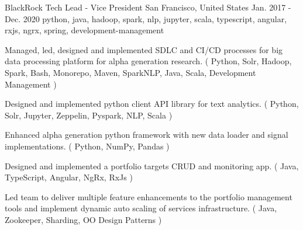 \cventry
    {BlackRock} %
    {Tech Lead - Vice President} %
    {San Francisco, United States} %
    {Jan. 2017 - Dec. 2020} %
    { python, java, hadoop, spark, nlp, jupyter, scala, typescript, angular, rxjs, ngrx, spring, development-management} %
    {
    \begin{cvitems} %
        \item { Managed, led, designed and implemented SDLC and CI/CD processes for big data processing platform for alpha generation research. ( Python, Solr, Hadoop, Spark, Bash, Monorepo, Maven, SparkNLP, Java, Scala, Development Management ) }
        \item { Designed and implemented python client API library for text analytics. ( Python, Solr, Jupyter, Zeppelin, Pyspark, NLP, Scala )}
        \item { Enhanced alpha generation python framework with new data loader and signal implementations. ( Python, NumPy, Pandas )}
        \item { Designed and implemented a portfolio targets CRUD and monitoring app. ( Java, TypeScript, Angular, NgRx, RxJs ) }
        \item { Led team to deliver multiple feature enhancements to the portfolio management tools and implement dynamic auto scaling of services infrastructure. ( Java, Zookeeper, Sharding, OO Design Patterns )}
    \end{cvitems}
    }





